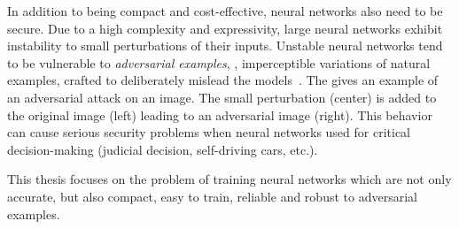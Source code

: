 In addition to being compact and cost-effective, neural networks also need to be secure.
Due to a high complexity and expressivity, large neural networks exhibit instability to small perturbations of their inputs.
Unstable neural networks tend to be vulnerable to \emph{adversarial examples}, \ie, imperceptible variations of natural examples, crafted to deliberately mislead the models~\cite{globerson2006nightmare,biggio2013evasion,szegedy2013intriguing}.
The  gives an example of an adversarial attack on an image.
The small perturbation (center) is added to the original image (left) leading to an adversarial image (right).
This behavior can cause serious security problems when neural networks used for critical decision-making (\eg judicial decision, self-driving cars, etc.).

This thesis focuses on the problem of training neural networks which are not only accurate, but also compact, easy to train, reliable and robust to adversarial examples.





%







